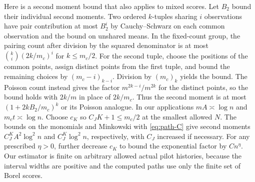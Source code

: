 Here is a second moment bound that also applies to mixed scores.
Let \(B_2\) bound their individual second moments. Two ordered
\(k\)-tuples sharing \(i\) observations have pair contribution
at most \(B_2^i\) by Cauchy--Schwarz on each common observation
and the bound on unshared means. In the fixed-count group,
the pairing count after division by the squared denominator
is at most \(\binom{k}{i}(2k/m_c)^i\) for \(k\le m_c/2\).
For the second tuple, choose the positions of the common points,
assign distinct points from the first tuple, and bound the
remaining choices by \((m_c-i)_{k-i}\). Division by
\((m_c)_k\) yields the bound. The Poisson count instead gives
the factor \(m^{2k-i}/m^{2k}\) for the distinct points,
so the bound holds with \(2k/m\) in place of \(2k/m_c\).
Thus the second moment is at most \((1+2k B_2/m_c)^k\)
or its Poisson analogue. In our applications
\(mA\asymp\log n\) and \(m_c t\asymp\log n\).
Choose \(c_K\) so \(C_J K+1\le m_c/2\) at the
smallest allowed \(N\). The bounds on the monomials and
Minkowski with \eqref{eq:path-C} give second moments
\(C_J^K A^2\log^2 n\) and \(C_J^K\log^2 n\), respectively,
with \(C_J\) increased if necessary.
For any prescribed \(\eta>0\), further decrease \(c_K\)
to bound the exponential factor by \(C n^\eta\).
Our estimator is finite on arbitrary allowed actual pilot
histories, because the interval widths are positive and the
computed paths use only the finite set of Borel scores.

